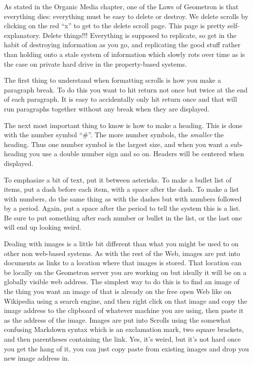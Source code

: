 As stated in the Organic Media chapter, one of the Laws of Geometron is that everything dies: everything must be easy to delete or destroy. We delete scrolls by clicking on the red ``x'' to get to the delete scroll page.  This page is pretty self-explanatory.  Delete things!!! Everything is supposed to replicate, so get in the habit of destroying information as you go, and replicating the good stuff rather than holding onto a stale system of information which slowly rots over time as is the case on private hard drive in the property-based systems.

The first thing to understand when formatting scrolls is how you make a paragraph break.  To do this you want to hit return not once but twice at the end of each paragraph. It is easy to accidentally only hit return once and that will run paragraphs together without any break when they are displayed.  

The next most important thing to know is how to make a heading.  This is done with the number symbol ``#''.  The more number symbols, the \emph{smaller} the heading.  Thus one number symbol is the largest size, and when you want a sub-heading you use a double number sign and so on.  Headers will be centered when displayed.  

To emphasize a bit of text, put it between asterisks. To make a bullet list of items, put a dash before each item, with a space after the dash. To make a list with numbers, do the same thing as with the dashes but with numbers followed by a period. Again, put a space after the period to tell the system this is a list.  Be sure to put something after each number or bullet in the list, or the last one will end up looking weird.

Dealing with images is a little bit different than what you might be used to on other non web-based systems.  As with the rest of the Web, images are put into documents as links to a location where that images is stored.  That location can be locally on the Geometron server you are working on but ideally it will be on a globally visible web address.  The simplest way to do this is to find an image of the thing you want an image of that is already on the free open Web like on Wikipedia using a search engine, and then right click on that image and copy the image address to the clipboard of whatever machine you are using, then paste it as the address of the image.  Images are put into Scrolls using the somewhat confusing Markdown syntax which is an exclamation mark, two square brackets, and then parentheses containing the link.  Yes, it's weird, but it's not hard once you get the hang of it, you can just copy paste from existing images and drop you new image address in.  

